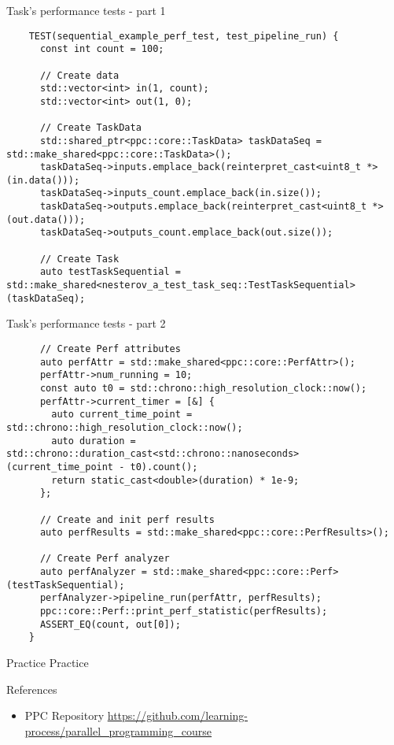 \documentclass{beamer}
\begin{document}
\begin{frame}[fragile]{Task's performance tests - part 1}
  \lstset{style=CStyle, caption=perf\_tests/main.cpp}
  \begin{lstlisting}
    TEST(sequential_example_perf_test, test_pipeline_run) {
      const int count = 100;
    
      // Create data
      std::vector<int> in(1, count);
      std::vector<int> out(1, 0);
    
      // Create TaskData
      std::shared_ptr<ppc::core::TaskData> taskDataSeq = std::make_shared<ppc::core::TaskData>();
      taskDataSeq->inputs.emplace_back(reinterpret_cast<uint8_t *>(in.data()));
      taskDataSeq->inputs_count.emplace_back(in.size());
      taskDataSeq->outputs.emplace_back(reinterpret_cast<uint8_t *>(out.data()));
      taskDataSeq->outputs_count.emplace_back(out.size());
    
      // Create Task
      auto testTaskSequential = std::make_shared<nesterov_a_test_task_seq::TestTaskSequential>(taskDataSeq);
  \end{lstlisting}
\end{frame}

\begin{frame}[fragile]{Task's performance tests - part 2}
  \lstset{style=CStyle, caption=perf\_tests/main.cpp}
  \begin{lstlisting}
      // Create Perf attributes
      auto perfAttr = std::make_shared<ppc::core::PerfAttr>();
      perfAttr->num_running = 10;
      const auto t0 = std::chrono::high_resolution_clock::now();
      perfAttr->current_timer = [&] {
        auto current_time_point = std::chrono::high_resolution_clock::now();
        auto duration = std::chrono::duration_cast<std::chrono::nanoseconds>(current_time_point - t0).count();
        return static_cast<double>(duration) * 1e-9;
      };
    
      // Create and init perf results
      auto perfResults = std::make_shared<ppc::core::PerfResults>();
    
      // Create Perf analyzer
      auto perfAnalyzer = std::make_shared<ppc::core::Perf>(testTaskSequential);
      perfAnalyzer->pipeline_run(perfAttr, perfResults);
      ppc::core::Perf::print_perf_statistic(perfResults);
      ASSERT_EQ(count, out[0]);
    }
  \end{lstlisting}
\end{frame}

\begin{frame}[fragile]{Practice}
  Practice
\end{frame}

\begin{frame}{References}
  \begin{itemize}
    \item PPC Repository \href{https://github.com/learning-process/parallel\_programming\_course}{https://github.com/learning-process/parallel\_programming\_course}
  \end{itemize}
\end{frame}
\end{document}
